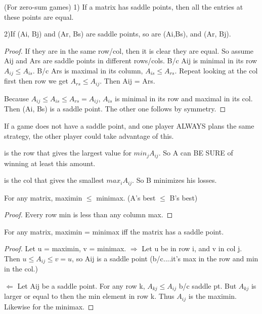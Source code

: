 \begin{theorem} (For zero-sum games)
1)  If a matrix has saddle points, then all the entries at these points are equal.

2)If (Ai, Bj) and (Ar, Bs) are saddle points, so are (Ai,Bs), and (Ar, Bj).
\end{theorem}

\begin{proof}
If they are in the same row/col, then it is clear they are equal. So assume Aij and Ars are saddle points in different rows/cols. B/c Aij is minimal in its row $A_{ij} \leq A_{is}$. B/c Ars is maximal in its column, $A_{is} \leq A_{rs}$. Repeat looking at the col first then row we get $A_{rs} \leq A_{ij}$. Then Aij = Ars.

Because $A_{ij} \leq A_{is} \leq A_{rs} = A_{ij}$, $A_{is}$ is minimal in its row and maximal in its col. Then (Ai, Bs) is a saddle point. The other one follows by symmetry.
\end{proof}

If a game does not have a saddle point, and one player ALWAYS plans the same strategy, the other player could take advantage of this.


\begin{definition}
 is the row that gives the largest value for $min_j A_{ij}$. So A can BE SURE of winning at least this amount.

 is the col that gives the smallest $max_i A_{ij}$. So B minimizes his losses. 
\end{definition}



\begin{theorem} 
For any matrix, maximin $\leq$ minimax. (A's best $\leq$ B's best)
\end{theorem}

\begin{proof}
Every row min is less than any column max. 
\end{proof}


\begin{theorem} 
For any matrix, maximin = minimax iff the matrix has a saddle point.
\end{theorem}

\begin{proof} 
Let u = maximin, v = minimax.
$\Rightarrow$ Let u be in row i, and v in col j. Then $u \leq A_{ij} \leq v = u$, so Aij is a saddle point (b/c....it's max in the row and min in the col.)

$\Leftarrow$ Let Aij be a saddle point. For any row k, $A_{kj} \leq A_{ij}$ b/c saddle pt. But $A_{kj}$ is larger or equal to then the min element in row k. Thus $A_{ij}$ is the maximin. Likewise for the minimax.
\end{proof}

